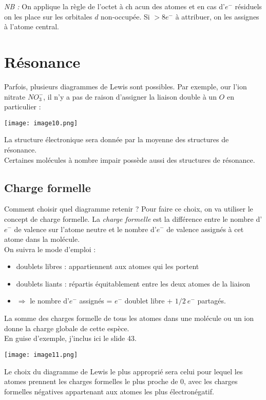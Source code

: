 \documentclass[british,french,11pt, a4paper, openany]{book}
\begin{document}
\textit{NB :} On applique la règle de l'octet à ch acun des atomes et en cas d'$e^-$ résiduels on les place sur les orbitales $d$ non-occupée. Si $> 8 e^-$ à attribuer, on les assignes à l'atome central.
\newpage
\section{Résonance}
Parfois, plusieurs diagrammes de Lewis sont possibles. Par exemple, our l'ion nitrate $NO_3^-$, il  n'y a pas de raison d'assigner la liaison double à un $O$ en particulier :
\begin{center}
	\texttt{[image: image10.png]}\\
\end{center}
La structure électronique sera donnée par la moyenne des structures de résonance.\\
Certaines molécules à nombre impair possède aussi des structures de résonance.\\

\subsection{Charge formelle}
Comment choisir quel diagramme retenir ? Pour faire ce choix, on va utiliser le concept de charge formelle.
La \textit{charge formelle} est la différence entre le nombre d'$e^-$ de valence sur l'atome neutre et le nombre d'$e^-$ de valence assignés à cet atome dans la molécule.\\
On suivra le mode d'emploi :
\begin{itemize}
	\item doublets libres : appartiennent aux atomes qui les portent
	\item doublets liants : répartis équitablement entre les deux atomes de la liaison
	\item $\Rightarrow$ le nombre d'$e^-$ assignés = $e^-$ doublet libre + $1/2\ e^-$ partagés.
\end{itemize}
La somme des charges formelle de tous les atomes dans une molécule ou un ion donne la charge globale de cette espèce.\\
En guise d'exemple, j'inclus ici le slide 43.\\
\begin{center}
	\texttt{[image: image11.png]}\\
\end{center}
Le choix du diagramme de Lewis le plus approprié sera celui pour lequel les atomes prennent les charges formelles le plus proche de 0, avec les charges formelles négatives appartenant aux atomes les plus électronégatif.
\end{document}

